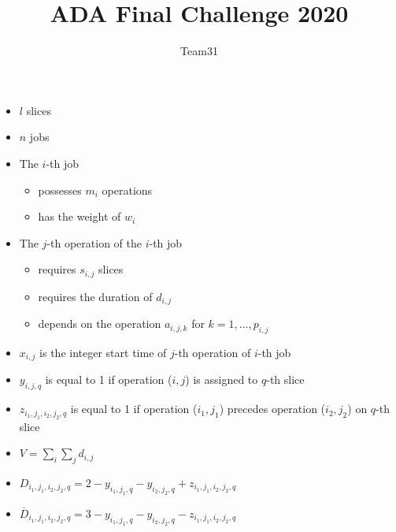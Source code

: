 \documentclass[12pt,a4paper]{article}
\title{ADA Final Challenge 2020}
\author{Team31}
\date{}
\begin{document}
\maketitle

\begin{itemize}
    \item $l$ slices
    \item $n$ jobs
    \item The $i$-th job
    \begin{itemize}
        \item possesses $m_i$ operations
        \item has the weight of $w_i$
    \end{itemize}
    \item The $j$-th operation of the $i$-th job
    \begin{itemize}
        \item requires $s_{i,j}$ slices
        \item requires the duration of $d_{i,j}$
        \item depends on the operation $a_{i,j,k}$ for $k=1,...,p_{i,j}$
    \end{itemize}
\end{itemize}
\hbox{}
\begin{itemize}
    \item $x_{i,j}$ is the integer start time of $j$-th operation of $i$-th job
    \item $y_{i,j,q}$ is equal to 1 if operation ($i,j$) is assigned to $q$-th slice
    \item $z_{i_1,j_1,i_2,j_2,q}$ is equal to 1 if operation ($i_1,j_1$) precedes operation ($i_2,j_2$) on $q$-th slice
    \item $V=\sum_{i}\sum_{j}d_{i,j}$
    \item $D_{i_1,j_1,i_2,j_2,q}=2-y_{i_1,j_1,q}-y_{i_2,j_2,q}+z_{i_1,j_1,i_2,j_2,q}$
    \item $\overline{D}_{i_1,j_1,i_2,j_2,q}=3-y_{i_1,j_1,q}-y_{i_2,j_2,q}-z_{i_1,j_1,i_2,j_2,q}$
\end{itemize}
\end{document}
